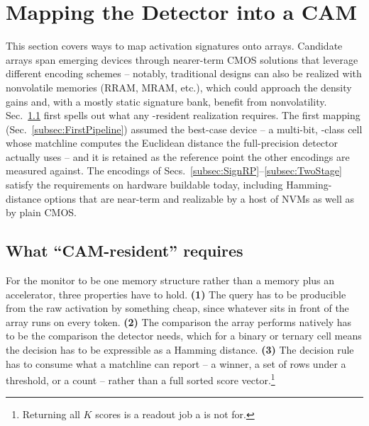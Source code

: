 \section{Mapping the Detector into a CAM}
\label{sec:Mapping}

This section covers ways to map activation signatures onto \cam
arrays. Candidate arrays span emerging devices through nearer-term
CMOS solutions that leverage different encoding schemes -- notably,
traditional \cam designs can also be realized with nonvolatile
memories (RRAM, MRAM, etc.), which could approach the density gains
and, with a mostly static signature bank, benefit from
nonvolatility. Sec.~\ref{subsec:Requirements} first spells out what
any \cam-resident realization requires. The first mapping
(Sec.~\ref{subsec:FirstPipeline}) assumed the best-case device -- a
multi-bit, \fefet-class cell whose matchline computes the Euclidean
distance the full-precision detector actually uses -- and it is
retained as the reference point the other encodings are measured
against. The encodings of
Secs.~\ref{subsec:SignRP}--\ref{subsec:TwoStage} satisfy the
requirements on hardware buildable today, including Hamming-distance
options that are near-term and realizable by a host of NVMs as well
as by plain CMOS.

\subsection{What ``CAM-resident'' requires}
\label{subsec:Requirements}
For the monitor to be one memory structure rather than a memory plus an
accelerator, three properties have to hold. {\bf (1)} The query has to
be producible from the raw activation by something cheap, since whatever
sits in front of the array runs on every token. {\bf (2)} The comparison
the array performs natively has to be the comparison the detector needs,
which for a binary or ternary cell means the decision has to be
expressible as a Hamming distance. {\bf (3)} The decision rule has to
consume what a matchline can report -- a winner, a set of rows under a
threshold, or a count -- rather than a full sorted score
vector.\footnote{Returning all $K$ scores is a readout job a \cam is
not for.}

